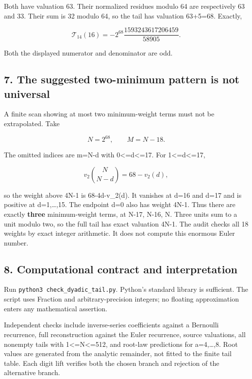\documentclass[11pt,letterpaper]{article}
\begin{document}
Both have valuation 63. Their normalized residues modulo 64 are respectively 63 and 33. Their sum is 32 modulo 64, so the tail has valuation 63+5=68. Exactly,

\[
\mathcal T_{14}(16)=-2^{68}\frac{1593243617206459}{58905}.
\]

Both the displayed numerator and denominator are odd.

\subsection{7. The suggested two-minimum pattern is not universal}\label{the-suggested-two-minimum-pattern-is-not-universal}

A finite scan showing at most two minimum-weight terms must not be extrapolated. Take

\[
N=2^{68},\qquad M=N-18.
\]

The omitted indices are m=N-d with 0\textless=d\textless=17. For 1\textless=d\textless=17,

\[
v_2\binom{N}{N-d}=68-v_2(d),
\]

so the weight above 4N-1 is 68-4d-v\_2(d). It vanishes at d=16 and d=17 and is positive at d=1,\ldots,15. The endpoint d=0 also has weight 4N-1. Thus there are exactly \textbf{three} minimum-weight terms, at N-17, N-16, N. Three units sum to a unit modulo two, so the full tail has exact valuation 4N-1. The audit checks all 18 weights by exact integer arithmetic. It does not compute this enormous Euler number.

\subsection{8. Computational contract and interpretation}\label{computational-contract-and-interpretation}

Run \texttt{python3\ check\_dyadic\_tail.py}. Python's standard library is sufficient. The script uses Fraction and arbitrary-precision integers; no floating approximation enters any mathematical assertion.

Independent checks include inverse-series coefficients against a Bernoulli recurrence, full reconstruction against the Euler recurrence, source valuations, all nonempty tails with 1\textless=N\textless=512, and root-law predictions for a=4,\ldots,8. Root values are generated from the analytic remainder, not fitted to the finite tail table. Each digit lift verifies both the chosen branch and rejection of the alternative branch.
\end{document}
